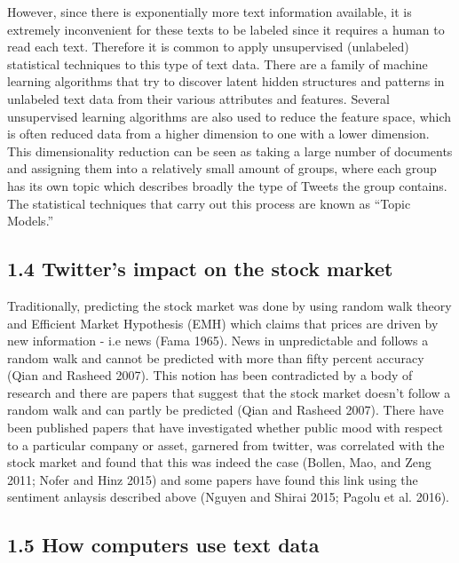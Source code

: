 \documentclass[
]{article}
\begin{document}
However, since there is exponentially more text information available,
it is extremely inconvenient for these texts to be labeled since it
requires a human to read each text. Therefore it is common to apply
unsupervised (unlabeled) statistical techniques to this type of text
data. There are a family of machine learning algorithms that try to
discover latent hidden structures and patterns in unlabeled text data
from their various attributes and features. Several unsupervised
learning algorithms are also used to reduce the feature space, which is
often reduced data from a higher dimension to one with a lower
dimension. This dimensionality reduction can be seen as taking a large
number of documents and assigning them into a relatively small amount of
groups, where each group has its own topic which describes broadly the
type of Tweets the group contains. The statistical techniques that carry
out this process are known as ``Topic Models.''

\hypertarget{twitters-impact-on-the-stock-market}{%
\subsection{1.4 Twitter's impact on the stock
market}\label{twitters-impact-on-the-stock-market}}

Traditionally, predicting the stock market was done by using random walk
theory and Efficient Market Hypothesis (EMH) which claims that prices
are driven by new information - i.e news (Fama 1965). News in
unpredictable and follows a random walk and cannot be predicted with
more than fifty percent accuracy (Qian and Rasheed 2007). This notion
has been contradicted by a body of research and there are papers that
suggest that the stock market doesn't follow a random walk and can
partly be predicted (Qian and Rasheed 2007). There have been published
papers that have investigated whether public mood with respect to a
particular company or asset, garnered from twitter, was correlated with
the stock market and found that this was indeed the case (Bollen, Mao,
and Zeng 2011; Nofer and Hinz 2015) and some papers have found this link
using the sentiment anlaysis described above (Nguyen and Shirai 2015;
Pagolu et al. 2016).

\hypertarget{how-computers-use-text-data}{%
\subsection{1.5 How computers use text
data}\label{how-computers-use-text-data}}
\end{document}
